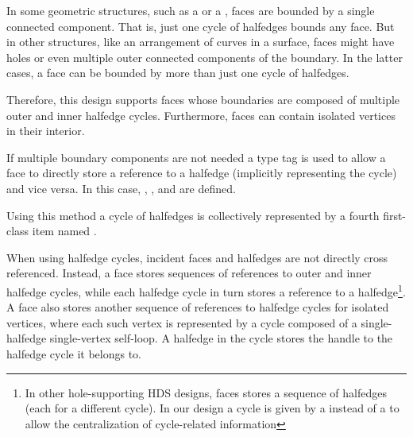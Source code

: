 
{\XHDS
In some geometric structures, such as a  or a ,
faces are bounded by a single connected component. That is, just one cycle of halfedges bounds
any face. But in other structures, like an arrangement of curves in a surface, faces
might have holes or even multiple outer connected components of the boundary. 
In the latter cases, a face can be bounded by more than just one cycle of halfedges. 

Therefore, this design supports faces
whose boundaries are composed of multiple outer and inner halfedge cycles. Furthermore, faces can contain isolated vertices in their interior.




If multiple boundary components are not needed a type tag is used to allow a face to directly store 
a reference to a halfedge (implicitly representing the cycle) and vice versa. In this case, , ,  
and  are defined.


Using this method a cycle of halfedges is collectively represented 
by a fourth first-class  item named .

When using halfedge cycles, incident faces and halfedges are not directly cross referenced.
Instead, a face stores sequences of references to outer and inner halfedge cycles, while each 
halfedge cycle in turn stores a reference to a halfedge\footnote{In other
hole-supporting HDS designs, faces stores a sequence of halfedges (each for a different cycle).
In our design a cycle is given by a  instead of a  to allow 
the centralization of cycle-related information}. 
A face also stores another sequence of references to halfedge cycles for isolated vertices, where
each such vertex is represented by a cycle composed of a single-halfedge single-vertex self-loop.
A halfedge in the cycle stores the handle to the halfedge cycle it belongs to.

}
